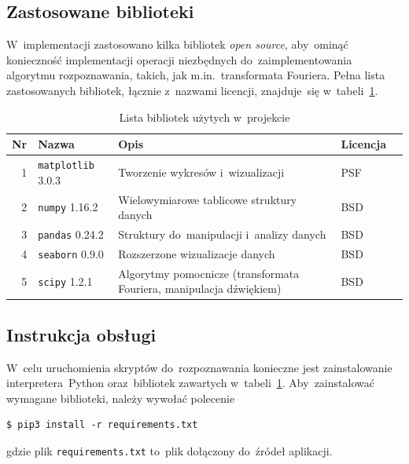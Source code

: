 \documentclass[11pt,a4paper]{article}
\begin{document}
\subsection{Zastosowane biblioteki}

W~implementacji zastosowano kilka bibliotek \emph{open source}, aby~ominąć konieczność implementacji operacji niezbędnych do~zaimplementowania algorytmu rozpoznawania, takich, jak m.in.~transformata Fouriera.
Pełna lista zastosowanych bibliotek, łącznie z~nazwami licencji, znajduje~się w~tabeli~\ref{tbl:libraries}.

\begin{table}[H]
    \begin{tabularx}{\textwidth}{|r|l|X|l|c|}
        \hline
        Nr & Nazwa & Opis & Licencja & \\
        \hline
        \hline
        1 & \texttt{matplotlib} 3.0.3 & Tworzenie wykresów i~wizualizacji & PSF & \cite{hunter2007} \\
        \hline
        2 & \texttt{numpy} 1.16.2 & Wielowymiarowe tablicowe struktury danych & BSD & \cite{oliphant2006} \\
        \hline
        3 & \texttt{pandas} 0.24.2 & Struktury do~manipulacji i~analizy danych & BSD & \cite{mckinney2010} \\
        \hline
        4 & \texttt{seaborn} 0.9.0 & Rozszerzone wizualizacje danych & BSD & \cite{waskom2018} \\
        \hline
        5 & \texttt{scipy} 1.2.1 & Algorytmy pomocnicze (transformata Fouriera, manipulacja dźwiękiem) & BSD & \cite{jones2001} \\
        \hline
    \end{tabularx}
    \caption{Lista bibliotek użytych w~projekcie}
    \label{tbl:libraries}
\end{table}

\subsection{Instrukcja obsługi}
\label{sec:manual}

W~celu uruchomienia skryptów do~rozpoznawania konieczne jest zainstalowanie interpretera~Python oraz~bibliotek zawartych w~tabeli~\ref{tbl:libraries}.
Aby~zainstalować wymagane biblioteki, należy wywołać polecenie
\begin{verbatim}
$ pip3 install -r requirements.txt
\end{verbatim}
gdzie plik \texttt{requirements.txt} to~plik dołączony do~źródeł aplikacji.
\end{document}
